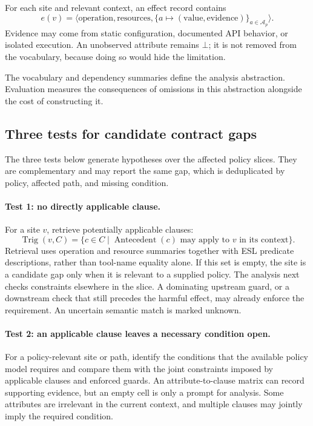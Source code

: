 For each site and relevant context, an effect record contains
\[
 e(v)=\langle
 \text{operation},\text{resources},
 \{a\mapsto(\text{value},\text{evidence})\}_{a\in\mathcal A_p}
 \rangle.
\]
Evidence may come from static configuration, documented API behavior, or
isolated execution. An unobserved attribute remains \(\bot\); it is not removed
from the vocabulary, because doing so would hide the limitation.

The vocabulary and dependency summaries define the analysis abstraction. Evaluation measures the consequences of omissions in this abstraction alongside the cost of constructing it.

\subsection{Three tests for candidate contract gaps}
\label{sec:coverage}

The three tests below generate hypotheses over the affected policy slices.
They are complementary and may report the same gap, which is deduplicated by policy,
affected path, and missing condition.

\paragraph{Test 1: no directly applicable clause.}
For a site \(v\), retrieve potentially applicable clauses:
\[
 \operatorname{Trig}(v,C)
 =
 \{c\in C\mid
 \operatorname{Antecedent}(c)
 \text{ may apply to }v\text{ in its context}\}.
\]
Retrieval uses operation and resource summaries together with ESL predicate
descriptions, rather than tool-name equality alone. If this set is empty,
the site is a candidate gap only when it is relevant to a supplied policy.
The analysis next checks constraints elsewhere in the slice. A dominating upstream guard, or a downstream check that still precedes the harmful effect, may already enforce the requirement.
An uncertain semantic match is marked unknown.

\paragraph{Test 2: an applicable clause leaves a necessary condition open.}
For a policy-relevant site or path, identify the conditions that the available
policy model requires and compare them with the joint constraints imposed
by applicable clauses and enforced guards. An attribute-to-clause matrix can
record supporting evidence, but an empty cell is only a prompt for analysis.
Some attributes are irrelevant in the current context, and multiple clauses
may jointly imply the required condition.

